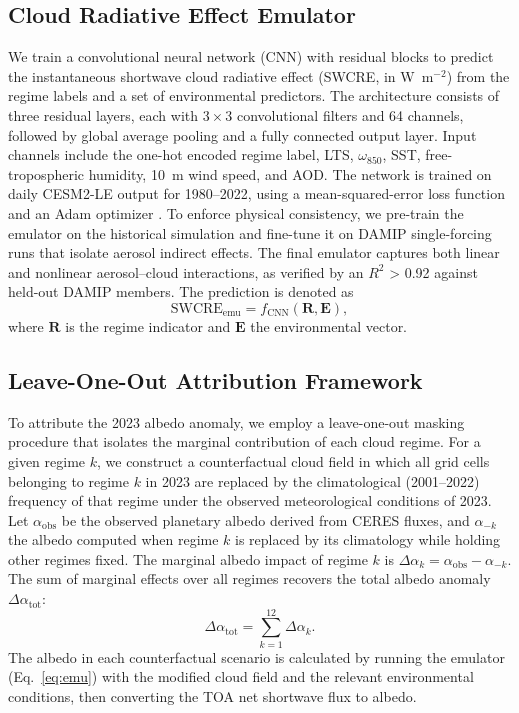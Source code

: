 \documentclass{article}
\begin{document}
\subsection{Cloud Radiative Effect Emulator}
We train a convolutional neural network (CNN) with residual blocks \cite{he2016deep} to predict the instantaneous shortwave cloud radiative effect (SWCRE, in W~m$^{-2}$) from the regime labels and a set of environmental predictors. The architecture consists of three residual layers, each with $3\times 3$ convolutional filters and 64 channels, followed by global average pooling and a fully connected output layer. Input channels include the one-hot encoded regime label, LTS, $\omega_{850}$, SST, free-tropospheric humidity, 10~m wind speed, and AOD. The network is trained on daily CESM2-LE output for 1980--2022, using a mean-squared-error loss function and an Adam optimizer \cite{kingma2014adam}. To enforce physical consistency, we pre-train the emulator on the historical simulation and fine-tune it on DAMIP single-forcing runs that isolate aerosol indirect effects. The final emulator captures both linear and nonlinear aerosol–cloud interactions, as verified by an $R^2$ > 0.92 against held-out DAMIP members. The prediction is denoted as
\begin{equation}
\mathrm{SWCRE}_{\text{emu}} = f_{\text{CNN}}(\mathbf{R}, \mathbf{E}),
\label{eq:emu}
\end{equation}
where $\mathbf{R}$ is the regime indicator and $\mathbf{E}$ the environmental vector.

\subsection{Leave-One-Out Attribution Framework}
To attribute the 2023 albedo anomaly, we employ a leave-one-out masking procedure that isolates the marginal contribution of each cloud regime. For a given regime $k$, we construct a counterfactual cloud field in which all grid cells belonging to regime $k$ in 2023 are replaced by the climatological (2001--2022) frequency of that regime under the observed meteorological conditions of 2023. Let $\alpha_{\text{obs}}$ be the observed planetary albedo derived from CERES fluxes, and $\alpha_{-k}$ the albedo computed when regime $k$ is replaced by its climatology while holding other regimes fixed. The marginal albedo impact of regime $k$ is $\Delta\alpha_k = \alpha_{\text{obs}} - \alpha_{-k}$. The sum of marginal effects over all regimes recovers the total albedo anomaly $\Delta\alpha_{\text{tot}}$:
\begin{equation}
\Delta\alpha_{\text{tot}} = \sum_{k=1}^{12} \Delta\alpha_k.
\label{eq:decomposition}
\end{equation}
The albedo in each counterfactual scenario is calculated by running the emulator (Eq.~\ref{eq:emu}) with the modified cloud field and the relevant environmental conditions, then converting the TOA net shortwave flux to albedo.
\end{document}
